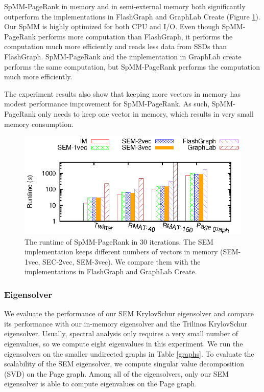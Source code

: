 SpMM-PageRank in memory and in semi-external memory both significantly outperform
the implementations in FlashGraph and GraphLab Create (Figure \ref{perf:pagerank}).
Our SpMM is highly optimized for both CPU
and I/O. Even though SpMM-PageRank performs more computation than FlashGraph,
it performs the computation much more efficiently and
reads less data from SSDs than FlashGraph. SpMM-PageRank and the implementation
in GraphLab create performs the same computation, but SpMM-PageRank
performs the computation much more efficiently.

The experiment results also show that keeping more vectors in memory has modest
performance improvement for SpMM-PageRank. As such, SpMM-PageRank only needs
to keep one vector in memory, which results in very small memory consumption.

\begin{figure}
	\begin{center}
		\footnotesize
		\includegraphics[scale=1]{SpMM_figs/pagerank.eps}
		\caption{The runtime of SpMM-PageRank in 30 iterations. The SEM
			implementation keeps different numbers of vectors in memory
			(SEM-1vec, SEC-2vec, SEM-3vec). We compare them with
		the implementations in FlashGraph and GraphLab Create.}
		\label{perf:pagerank}
	\end{center}
\end{figure}

\subsubsection{Eigensolver}

We evaluate the performance of our SEM KrylovSchur eigensolver and compare
its performance
with our in-memory eigensolver and the Trilinos KrylovSchur eigensolver.
Usually, spectral analysis only requires a very small number of
eigenvalues, so we compute eight eigenvalues in this experiment. We run
the eigensolvers on the smaller undirected graphs
in Table \ref{graphs}. To evaluate the scalability of the SEM eigensolver,
we compute singular value decomposition (SVD) on the Page graph. Among all of
the eigensolvers, only our SEM eigensolver is able to compute eigenvalues
on the Page graph.


